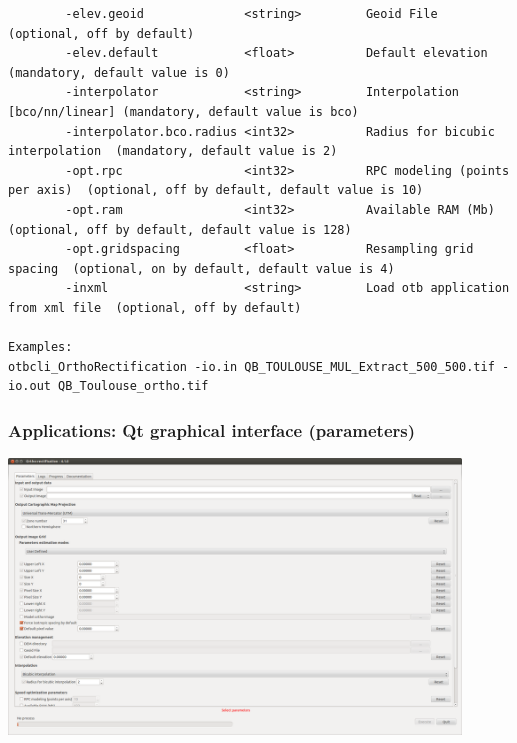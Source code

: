 \documentclass[8pt]{beamer}
\begin{document}
\begin{frame}[fragile]
\begin{scriptsize}
\begin{verbatim}
        -elev.geoid              <string>         Geoid File  (optional, off by default)
        -elev.default            <float>          Default elevation  (mandatory, default value is 0)
        -interpolator            <string>         Interpolation [bco/nn/linear] (mandatory, default value is bco)
        -interpolator.bco.radius <int32>          Radius for bicubic interpolation  (mandatory, default value is 2)
        -opt.rpc                 <int32>          RPC modeling (points per axis)  (optional, off by default, default value is 10)
        -opt.ram                 <int32>          Available RAM (Mb)  (optional, off by default, default value is 128)
        -opt.gridspacing         <float>          Resampling grid spacing  (optional, on by default, default value is 4)
        -inxml                   <string>         Load otb application from xml file  (optional, off by default)

Examples: 
otbcli_OrthoRectification -io.in QB_TOULOUSE_MUL_Extract_500_500.tif -io.out QB_Toulouse_ortho.tif
\end{verbatim}
\end{scriptsize}
\end{frame}

\begin{frame}[fragile]
\frametitle{Applications: Qt graphical interface (parameters)}
\begin{center}
\includegraphics[width=0.9\textwidth]{images/app_parameters.png}
\end{center}
\end{frame}
\end{document}
